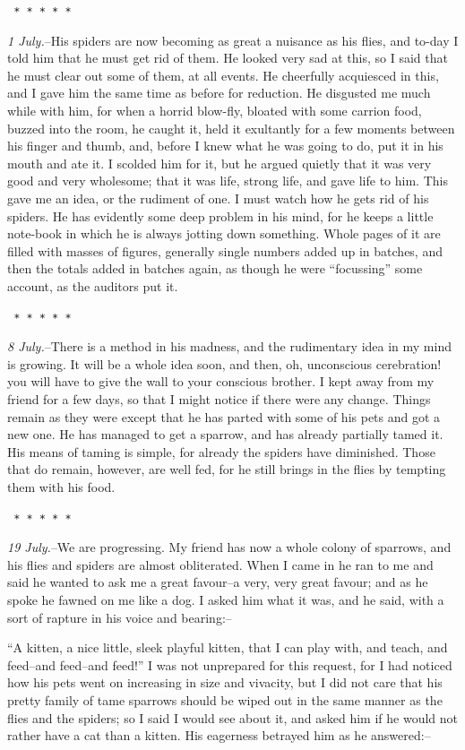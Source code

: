 \documentclass[12pt,openright]{book}
\begin{document}
\texttt{   *       *       *       *       *}

\textit{1 July.}–His spiders are now becoming as great a nuisance as his flies, and to-day I told him that he must get rid of them. He looked very sad at this, so I said that he must clear out some of them, at all events. He cheerfully acquiesced in this, and I gave him the same time as before for reduction. He disgusted me much while with him, for when a horrid blow-fly, bloated with some carrion food, buzzed into the room, he caught it, held it exultantly for a few moments between his finger and thumb, and, before I knew what he was going to do, put it in his mouth and ate it. I scolded him for it, but he argued quietly that it was very good and very wholesome; that it was life, strong life, and gave life to him. This gave me an idea, or the rudiment of one. I must watch how he gets rid of his spiders. He has evidently some deep problem in his mind, for he keeps a little note-book in which he is always jotting down something. Whole pages of it are filled with masses of figures, generally single numbers added up in batches, and then the totals added in batches again, as though he were “focussing” some account, as the auditors put it.

\texttt{   *       *       *       *       *}

\textit{8 July.}–There is a method in his madness, and the rudimentary idea in my mind is growing. It will be a whole idea soon, and then, oh, unconscious cerebration! you will have to give the wall to your conscious brother. I kept away from my friend for a few days, so that I might notice if there were any change. Things remain as they were except that he has parted with some of his pets and got a new one. He has managed to get a sparrow, and has already partially tamed it. His means of taming is simple, for already the spiders have diminished. Those that do remain, however, are well fed, for he still brings in the flies by tempting them with his food.

\texttt{   *       *       *       *       *}

\textit{19 July.}–We are progressing. My friend has now a whole colony of sparrows, and his flies and spiders are almost obliterated. When I came in he ran to me and said he wanted to ask me a great favour–a very, very great favour; and as he spoke he fawned on me like a dog. I asked him what it was, and he said, with a sort of rapture in his voice and bearing:–

“A kitten, a nice little, sleek playful kitten, that I can play with, and teach, and feed–and feed–and feed!” I was not unprepared for this request, for I had noticed how his pets went on increasing in size and vivacity, but I did not care that his pretty family of tame sparrows should be wiped out in the same manner as the flies and the spiders; so I said I would see about it, and asked him if he would not rather have a cat than a kitten. His eagerness betrayed him as he answered:–
\end{document}
